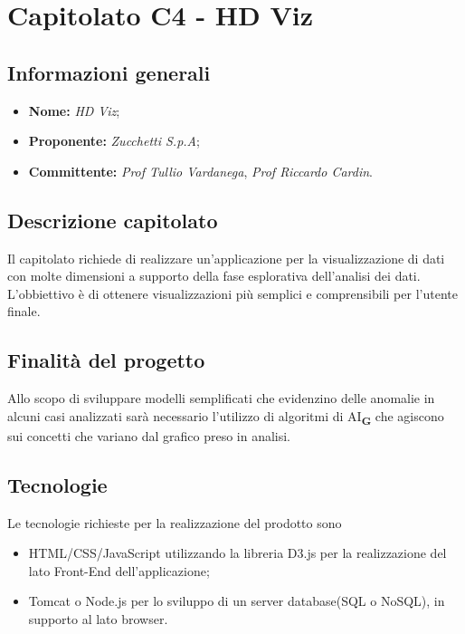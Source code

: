 \section{Capitolato C4 - HD Viz}

\subsection{Informazioni generali}

\begin{itemize}
\item \textbf{Nome:} \textit{HD Viz};
\item \textbf{Proponente:} \textit{Zucchetti S.p.A};
\item \textbf{Committente:} \emph{Prof Tullio Vardanega}, \emph{Prof Riccardo Cardin}.
\end{itemize}

\subsection{Descrizione capitolato}
Il capitolato richiede di realizzare un'applicazione per la
visualizzazione di dati con molte dimensioni a supporto della fase esplorativa
dell'analisi dei dati. L'obbiettivo è di ottenere visualizzazioni più semplici e comprensibili per l'utente finale. 

\subsection{Finalità del progetto}
Allo scopo di sviluppare modelli semplificati che evidenzino delle anomalie in alcuni casi analizzati sarà necessario l'utilizzo di algoritmi di AI\textsubscript{\textbf{G}} che agiscono sui concetti che variano dal grafico preso in analisi.
 
\subsection{Tecnologie}
Le tecnologie richieste per la realizzazione del prodotto sono 
\begin{itemize}
\item HTML/CSS/JavaScript utilizzando la libreria D3.js per la realizzazione del lato Front-End dell'applicazione;
\item Tomcat o Node.js per lo sviluppo di un server database(SQL o NoSQL), in supporto al lato browser.
\end{itemize}


